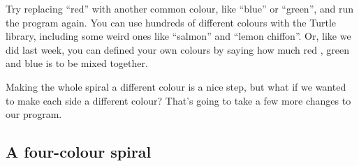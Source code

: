 \documentclass{coderdojo}
\begin{document}

Try replacing ``red'' with another common colour, like ``blue'' or ``green'', and run the program again. You can use hundreds of different colours with the Turtle library, including some weird ones like ``salmon'' and ``lemon chiffon''. Or, like we did last week, you can defined your own colours by saying how much red , green and blue is to be mixed together.

Making the whole spiral a different colour is a nice step, but what if we wanted to make each side a different colour? That's going to take a few more changes to our program.

\subsection{A four-colour spiral}
\end{document}
